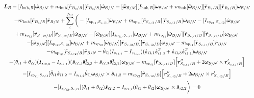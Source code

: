 \documentclass[paper]{aiaaNew}
\begin{document}
\begin{multline}
\bm L_B -[I_{\text{hub},B}] \dot{\bm\omega}_{\cal B/N} + m_{\text{hub}} [\tilde{{\bm r}}_{B_c/B}] [\tilde{{\bm r}}_{B_c/B}] \bm{\dot{\omega}}_{\cal B/N} -[\bm{\tilde{\omega}}_{\cal B/N}] [I_{\text{hub},B}] \bm\omega_{\cal B/N} + m_{\text{hub}} [\bm{\tilde{\omega}}_{\cal B/N}] [\tilde{{\bm r}}_{B_c/B}] [\tilde{{\bm r}}_{B_c/B}]\bm\omega_{\cal B/N} \\
 - m_{\text{hub}} [\tilde{{\bm r}}_{B_c/B}] \ddot{\bm r}_{B/N} 
+ \sum\limits_{i}^{N_S}\bigg(-[I_{\text{sp}_{i1},S_{c,i1}}] \dot{\bm \omega}_{\cal{B/N}} + m_{\text{sp}_{i1}} [\tilde{{\bm r}}_{S_{c,i1}/B}] [\tilde{\bm{r}}_{S_{c,i1}/B}] \dot{\bm\omega}_{\cal B/N} -[I_{\text{sp}_{i2},S_{c,i2}}] \dot{\bm \omega}_{\cal{B/N}} \\
+ m_{\text{sp}_{i2}} [\tilde{{\bm r}}_{S_{c,i2}/B}] [\tilde{\bm{r}}_{S_{c,i2}/B}] \dot{\bm\omega}_{\cal B/N}
  -[\tilde{\bm \omega}_{\cal{B/N}}] [I_{\text{sp}_{i1},S_{c,i1}}] \bm \omega_{\cal{B/N}}
  + m_{\text{sp}_{i1}} [\tilde{\bm \omega}_{\cal{B/N}}] [\tilde{{\bm r}}_{S_{c,i1}/B}] [\tilde{{\bm r}}_{S_{c,i1}/B}] \bm\omega_{\cal B/N}
  \\
  -[\tilde{\bm \omega}_{\cal{B/N}}] [I_{\text{sp}_{i2},S_{c,i2}}] \bm \omega_{\cal{B/N}} + m_{\text{sp}_{i2}} [\tilde{\bm \omega}_{\cal{B/N}}] [\tilde{{\bm r}}_{S_{c,i2}/B}] [\tilde{{\bm r}}_{S_{c,i2}/B}] \bm\omega_{\cal B/N}
- m_{\text{sp}_{i1}} [\tilde{{\bm r}}_{S_{c,i1}/B}] \ddot{\bm r}_{B/N}\\
- m_{\text{sp}_{i2}} [\tilde{{\bm r}}_{S_{c,i2}/B}] \ddot{\bm r}_{B/N}
-\dot{\theta}_{i1} (I_{s_{i1,3}} - I_{s_{i1,1}})( \hat{\bm s}_{i1,1} \hat{\bm s}_{i1,3}^T + \hat{\bm s}_{i1,3} \hat{\bm s}_{i1,1}^T) \bm \omega_{\cal{B/N}} \\
-(\dot{\theta}_{i1}  + \dot{\theta}_{i2})(I_{s_{i2,3}} - I_{s_{i2,1}}) (\hat{\bm s}_{i2,1} \hat{\bm s}_{i2,3}^T + \hat{\bm s}_{i2,3} \hat{\bm s}_{i2,1}^T) \bm \omega_{\cal{B/N}} 
- m_{\text{sp}_{i1}} [\tilde{{\bm r}}_{S_{c,i1}/B}] \Big[\bm{r}''_{S_{c,i1}/B} + 2 \bm\omega_{\cal B/N} \times \bm{r}'_{S_{c,i1}/B}\Big]
\\
-[I_{\text{sp}_{i1},S_{c,i1}}] \ddot{\theta}_{i1} \hat{\bm s}_{i1,2} 
-I_{s_{i1,2}} \dot{\theta}_{i1} \bm \omega_{\cal{B/N}} \times \hat{\bm s}_{i1,2}
- m_{\text{sp}_{i2}} [\tilde{{\bm r}}_{S_{c,i2}/B}] \Big[ \bm{r}''_{S_{c,i2}/B} + 2 \bm\omega_{\cal B/N} \times \bm{r}'_{S_{c,i2}/B}\Big]
\\
-[I_{\text{sp}_{i2},S_{c,i2}}] (\ddot{\theta}_{i1}  + \ddot{\theta}_{i2})\hat{\bm s}_{i2,2} 
-I_{s_{i2,2}}  (\dot{\theta}_{i1}  + \dot{\theta}_{i2}) \bm \omega_{\cal{B/N}} \times \hat{\bm s}_{i2,2} \bigg) = 0
\end{multline}
\end{document}
